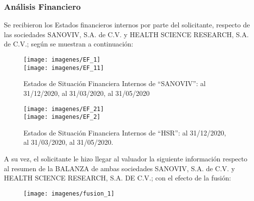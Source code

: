 \subsubsection{An\'alisis Financiero}

Se recibieron los Estados financieros internos por parte del solicitante, respecto de las sociedades \textcolor{principal}{SANOVIV, S.A. de C.V.} y \textcolor{principal}{HEALTH SCIENCE RESEARCH, S.A. de C.V.}; seg\'un se muestran a continuaci\'on:

\begin{center}
\begin{minipage}{10cm}
\begin{figure}[H]
\centering
\caption{\textcolor{principal}{Estados de Situaci\'on Financiera Internos de ``SANOVIV'': al 31/12/2020, al 31/03/2020, al 31/05/2020}\label{fig:ESF}}

\texttt{[image: imagenes/EF\_1]}\\
\texttt{[image: imagenes/EF\_11]}\\[5pt]

\end{figure}
\end{minipage}
\end{center}

\begin{center}

\begin{minipage}{10cm}
\begin{figure}[H]
\centering
\caption{\textcolor{principal}{Estados de Situaci\'on Financiera Internos de ``HSR'': al 31/12/2020, al 31/03/2020, al 31/05/2020.}\label{fig:ESF_2}}

\texttt{[image: imagenes/EF\_21]}\\
\texttt{[image: imagenes/EF\_2]}\\[5pt]

\end{figure}
\end{minipage}
\end{center}

A su vez, el solicitante le hizo llegar al valuador la siguiente informaci\'on respecto al resumen de la BALANZA de ambas sociedades  \textcolor{principal}{SANOVIV, S.A. de C.V.} y \textcolor{principal}{HEALTH SCIENCE RESEARCH, S.A. DE C.V.}; con el efecto de la fusi\'on:

\begin{figure}[H]
\centering
\texttt{[image: imagenes/fusion\_1]}
\end{figure}

